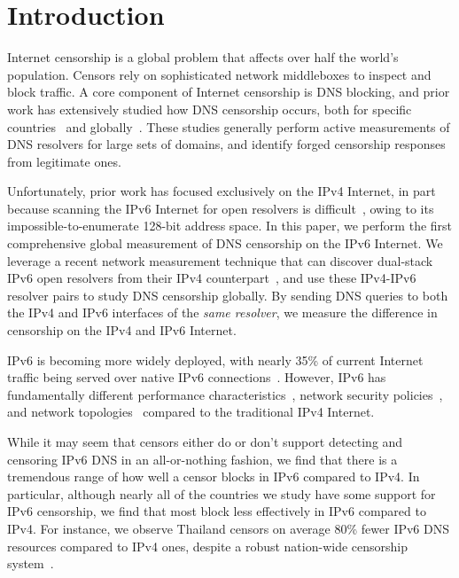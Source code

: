 \section{Introduction}\label{sec:intro}

Internet censorship is a global problem that affects over half the world's
population. Censors rely on sophisticated network middleboxes to inspect and
block traffic. A core component of Internet censorship is DNS blocking, and
prior work has extensively studied how DNS censorship occurs, both for specific
countries~\cite{Anonymous2020:TripletCensors,USESEC21:GFWatch} and
globally~\cite{kuhrer2015going,dagon2008corrupted,pearce2017global,scott2016satellite}.
%
These studies generally perform active measurements of DNS resolvers for large
sets of domains, and identify forged censorship responses from legitimate ones.

Unfortunately, prior work has focused exclusively on the IPv4 Internet, in part
because scanning the IPv6 Internet for open resolvers is
difficult~\cite{murdock2017target}, owing to its impossible-to-enumerate 128-bit
address space.
%
In this paper, we perform the first comprehensive global measurement of DNS
censorship on the IPv6 Internet. We leverage a recent network measurement
technique that can discover dual-stack IPv6 open resolvers from their IPv4
counterpart~\cite{hendriks2017potential}, and use these IPv4-IPv6 resolver pairs
to study DNS censorship globally. By sending DNS queries to both the IPv4 and IPv6
interfaces of the \emph{same resolver}, we measure the difference in
censorship on the IPv4 and IPv6 Internet.

\medskip

IPv6 is becoming more widely deployed, with nearly 35\% of current Internet
traffic being served over native IPv6 connections~\cite{Google-IPv6}. However,
IPv6 has fundamentally different performance
characteristics~\cite{Dhamdhere-IMC2012}, network security
policies~\cite{Czyz-NDSS2016}, and network topologies~\cite{Czyz-SIGCOMM2014}
compared to the traditional IPv4 Internet.

While it may seem that censors either do or don't support detecting and
censoring IPv6 DNS in an all-or-nothing fashion, we find that there is a
tremendous range of how well a censor blocks in IPv6 compared to IPv4.
%
In particular, although nearly all of the countries we study have some support
for IPv6 censorship, we find that most block less effectively in IPv6 compared
to IPv4. For instance, we observe Thailand censors on average 80\% fewer IPv6 DNS
resources compared to IPv4 ones, despite a robust nation-wide censorship
system~\cite{gebhart2017internet}.


